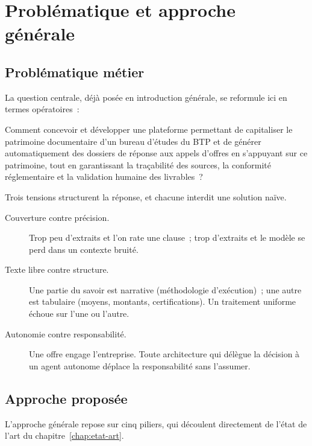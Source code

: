 \section{Problématique et approche générale}
\label{sec:ch2-problematique}

\subsection{Problématique métier}

La question centrale, déjà posée en introduction générale, se reformule ici
en termes opératoires~:

\begin{btpquote}
Comment concevoir et développer une plateforme permettant de capitaliser le
patrimoine documentaire d'un bureau d'études du BTP et de générer
automatiquement des dossiers de réponse aux appels d'offres en s'appuyant
sur ce patrimoine, tout en garantissant la traçabilité des sources, la
conformité réglementaire et la validation humaine des livrables~?
\end{btpquote}

Trois tensions structurent la réponse, et chacune interdit une solution
naïve.

\begin{description}
  \item[Couverture contre précision.] Trop peu d'extraits et l'on rate une
        clause~; trop d'extraits et le modèle se perd dans un contexte
        bruité.
  \item[Texte libre contre structure.] Une partie du savoir est narrative
        (méthodologie d'exécution)~; une autre est tabulaire (moyens,
        montants, certifications). Un traitement uniforme échoue sur l'une
        ou l'autre.
  \item[Autonomie contre responsabilité.] Une offre engage l'entreprise.
        Toute architecture qui délègue la décision à un agent autonome
        déplace la responsabilité sans l'assumer.
\end{description}

\subsection{Approche proposée}

L'approche générale repose sur cinq piliers, qui découlent directement de
l'état de l'art du chapitre~\ref{chap:etat-art}.

